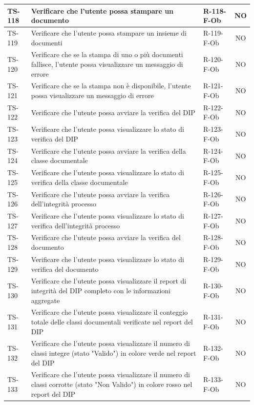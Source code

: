 \documentclass[a4paper,12pt]{article}
\begin{document}
\begin{longtable}{|p{1.5cm}|p{8.3cm}|p{2.4cm}|c|}
\hline
TS-118 & Verificare che l'utente possa stampare un documento & R-118-F-Ob & NO \\
\hline
TS-119 & Verificare che l'utente possa stampare un insieme di documenti & R-119-F-Ob & NO \\
\hline
TS-120 & Verificare che se la stampa di uno o più documenti fallisce, l'utente possa visualizzare un messaggio di errore & R-120-F-Ob & NO \\
\hline
TS-121 & Verificare che se la stampa non è disponibile, l'utente possa visualizzare un messaggio di errore & R-121-F-Ob & NO \\
\hline
TS-122 & Verificare che l'utente possa avviare la verifica del DIP & R-122-F-Ob & NO \\
\hline
TS-123 & Verificare che l'utente possa visualizzare lo stato di verifica del DIP & R-123-F-Ob & NO \\
\hline
TS-124 & Verificare che l'utente possa avviare la verifica della classe documentale & R-124-F-Ob & NO \\
\hline
TS-125 & Verificare che l'utente possa visualizzare lo stato di verifica della classe documentale & R-125-F-Ob & NO \\
\hline
TS-126 & Verificare che l'utente possa avviare la verifica dell'integrità processo & R-126-F-Ob & NO \\
\hline
TS-127 & Verificare che l'utente possa visualizzare lo stato di verifica dell'integrità processo & R-127-F-Ob & NO \\
\hline
TS-128 & Verificare che l'utente possa avviare la verifica del documento & R-128-F-Ob & NO \\
\hline
TS-129 & Verificare che l'utente possa visualizzare lo stato di verifica del documento & R-129-F-Ob & NO \\
\hline
TS-130 & Verificare che l'utente possa visualizzare il report di integrità del DIP completo con le informazioni aggregate & R-130-F-Ob & NO \\
\hline
TS-131 & Verificare che l'utente possa visualizzare il conteggio totale delle classi documentali verificate nel report del DIP & R-131-F-Ob & NO \\
\hline
TS-132 & Verificare che l'utente possa visualizzare il numero di classi integre (stato "Valido") in colore verde nel report del DIP & R-132-F-Ob & NO \\
\hline
TS-133 & Verificare che l'utente possa visualizzare il numero di classi corrotte (stato "Non Valido") in colore rosso nel report del DIP & R-133-F-Ob & NO \\

\end{longtable}
\end{document}
